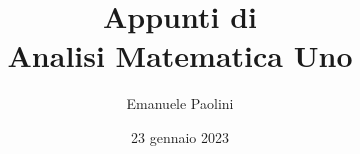 \documentclass[
	fontsize=10pt, %
	twoside=true, %
	pagewidth=8.5in,
	pageheight=11.0in,
	numbers=noenddots, %
]{mykaobook}
\begin{document}

\title[Appunti di Analisi Matematica Uno]{Appunti di\\Analisi Matematica Uno}
\author[EP]{Emanuele Paolini}
\date{23 gennaio 2023}
\publishers{manu-fatto}


\frontmatter %



\maketitle

\thispagestyle{empty}
\mbox{}
\vfill
\doclicenseThis





\begingroup %

\setlength{\textheight}{230\vscale} %
\end{document}

